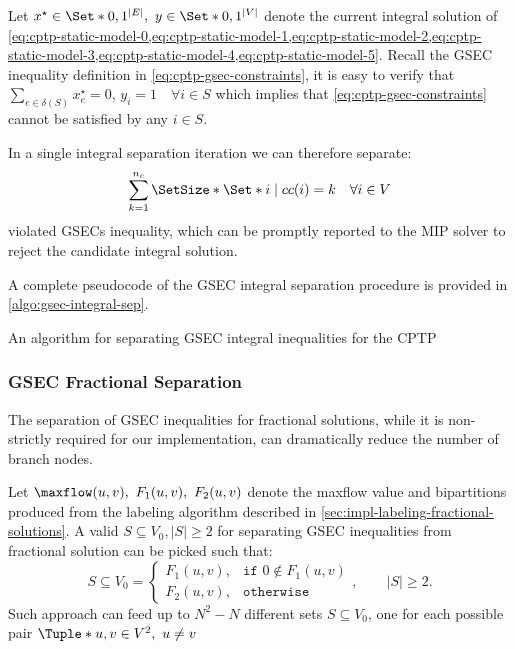 Let $x^\star \in \Set*{0, 1}^{|E|},\ y \in \Set*{0, 1}^{|V|}$ denote the
current integral solution of
\cref{eq:cptp-static-model-0,eq:cptp-static-model-1,eq:cptp-static-model-2,eq:cptp-static-model-3,eq:cptp-static-model-4,eq:cptp-static-model-5}.
Recall the GSEC inequality definition in \cref{eq:cptp-gsec-constraints},
it is easy to verify that
$\sum_{e \in \delta(S)} x^\star_{e} = 0$, $y_i =  1 \quad \forall i \in S$
which implies that \cref{eq:cptp-gsec-constraints} cannot be satisfied by any $i \in S$.

\medskip

In a single integral separation iteration we can therefore separate:
\begin{equation}
	\sum^{n_c}_{k = 1} \SetSize*{ \Set*{ i \mid cc(i) = k \quad \forall i \in V } }
\end{equation}
violated GSECs inequality, which can be promptly reported to the MIP solver to reject the candidate integral solution.

A complete pseudocode of the GSEC integral separation procedure is provided in \cref{algo:gsec-integral-sep}.

\begin{algorithm}
	\caption{An algorithm for separating GSEC integral inequalities for the CPTP}
	\label{algo:gsec-integral-sep}
	
\end{algorithm}

\subsubsection{GSEC Fractional Separation}
\label{sec:impl-gsec-fractional-separation}

The separation of GSEC inequalities for fractional solutions,
while it is non-strictly required for our implementation,
can dramatically reduce the number of branch nodes.

Let $\maxflow(u, v),\ F_1(u, v),\ F_2(u, v)$ denote the maxflow value and bipartitions
produced from the labeling algorithm described in \cref{sec:impl-labeling-fractional-solutions}.
A valid $S \subseteq V_0, |S| \ge 2$ for separating GSEC inequalities from fractional solution can be picked such that:
\begin{equation}
	S \subseteq V_0 =
	\begin{cases}
		F_1(u, v), & \texttt{if } 0 \notin F_1(u, v) \\
		F_2(u, v), & \texttt{otherwise}
	\end{cases},
	\qquad
	|S| \ge 2.
\end{equation}
Such approach can feed up to
$N^2 - N$ different sets $S \subseteq V_0$,
one for each possible pair $\Tuple*{u, v} \in V^2,\ u \ne v$

